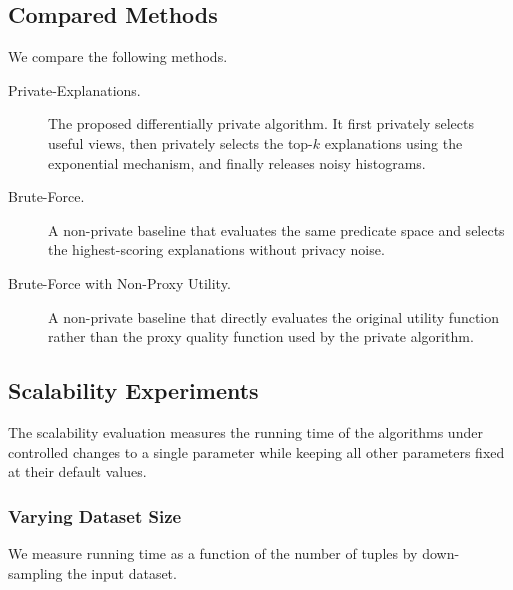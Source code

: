 
\subsection{Compared Methods}
\label{subsec:compared-methods}

We compare the following methods.

\begin{description}
    \item[Private-Explanations.]
    The proposed differentially private algorithm. It first privately selects
    useful views, then privately selects the top-$k$ explanations using the
    exponential mechanism, and finally releases noisy histograms.

    \item[Brute-Force.]
    A non-private baseline that evaluates the same predicate space and selects
    the highest-scoring explanations without privacy noise.

    \item[Brute-Force with Non-Proxy Utility.]
    A non-private baseline that directly evaluates the original utility function
    rather than the proxy quality function used by the private algorithm.
\end{description}


\subsection{Scalability Experiments}
\label{subsec:scalability}

The scalability evaluation measures the running time of the algorithms under
controlled changes to a single parameter while keeping all other parameters fixed
at their default values.

\subsubsection{Varying Dataset Size}
\label{subsubsec:runtime-tuples}

We measure running time as a function of the number of tuples by down-sampling
the input dataset.


